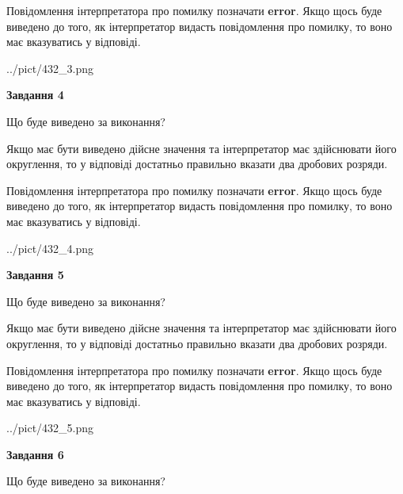 \documentclass[12pt, ukrainian]{article}
\begin{document}
{\begin {Large}
Повідомлення інтерпретатора про помилку позначати \textbf{error}.
Якщо щось буде виведено до того, як інтерпретатор видасть повідомлення про помилку, 
то воно має вказуватись у відповіді. \par

\begin{center}
	{../pict/432_3.png}
\end{center}
\newpage

{\begin {center}\textbf{Завдання 4}\end {center}}\par
Що буде виведено за виконання? \par

Якщо має бути виведено дійсне значення та інтерпретатор має здійснювати його округлення, 
то у відповіді достатньо правильно вказати два дробових розряди.

Повідомлення інтерпретатора про помилку позначати \textbf{error}.
Якщо щось буде виведено до того, як інтерпретатор видасть повідомлення про помилку, 
то воно має вказуватись у відповіді. \par

\begin{center}
	{../pict/432_4.png}
\end{center}
\newpage

{\begin {center}\textbf{Завдання 5}\end {center}}\par
Що буде виведено за виконання? \par

Якщо має бути виведено дійсне значення та інтерпретатор має здійснювати його округлення, 
то у відповіді достатньо правильно вказати два дробових розряди.

Повідомлення інтерпретатора про помилку позначати \textbf{error}.
Якщо щось буде виведено до того, як інтерпретатор видасть повідомлення про помилку, 
то воно має вказуватись у відповіді. \par

\begin{center}
	{../pict/432_5.png}
\end{center}
\newpage

{\begin {center}\textbf{Завдання 6}\end {center}}\par
Що буде виведено за виконання? \par


\end{Large}}
\end{document}
